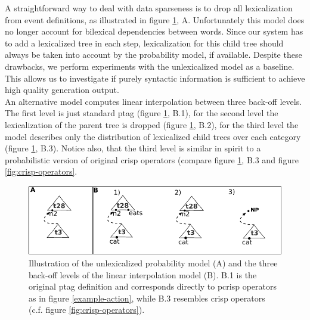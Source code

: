   A straightforward way to deal with data sparseness is to drop all lexicalization from event definitions, as illustrated in figure \ref{fig:modelillustration}, A. Unfortunately this model does no longer account for bilexical dependencies between words. Since our system has to add a lexicalized tree in each step, lexicalization for this child tree should always be taken into account by the probability model, if available. Despite these drawbacks, we perform experiments with the unlexicalized model as a baseline. This allows us to investigate if purely syntactic information is sufficient to achieve high quality generation output. \\  
An alternative model computes linear interpolation between three back-off levels. The first level is just standard {\sc ptag} (figure \ref{fig:modelillustration}, B.1), for the second level the lexicalization of the parent tree is dropped (figure \ref{fig:modelillustration}, B.2), for the third level the model describes only the distribution of lexicalized child trees over each category (figure \ref{fig:modelillustration}, B.3).  
Notice also, that the third level is similar in spirit to a probabilistic version of original {\sc crisp} operators (compare figure \ref{fig:modelillustration}, B.3 and figure \ref{fig:crisp-operators}. 
\begin{figure}[t]
\begin{center}
\includegraphics[width=.5\textwidth]{figures/modelillustration}
\caption{\label{fig:modelillustration} Illustration of the unlexicalized probability model (A) and the three back-off levels of the linear interpolation model (B). B.1 is the original {\sc ptag} definition and corresponds directly to {\sc pcrisp} operators as in figure \ref{example-action}, while B.3 resembles {\sc crisp} operators (c.f. figure \ref{fig:crisp-operators}).}

\end{center}
\end{figure}









